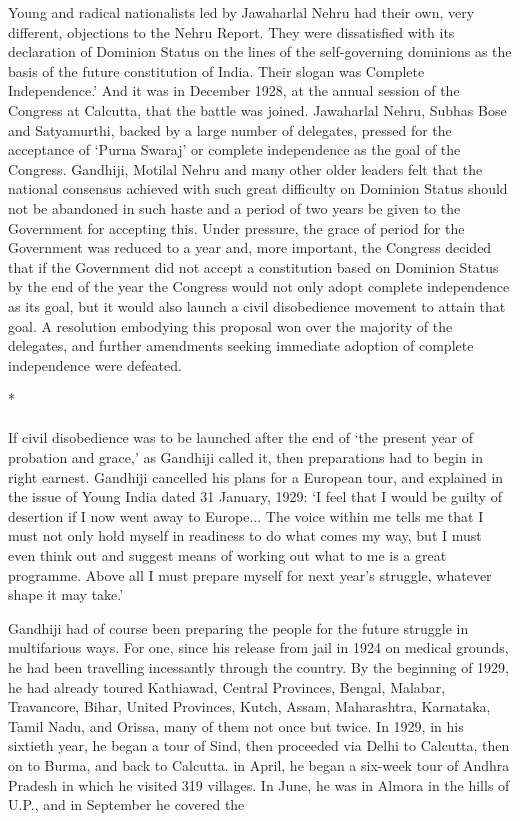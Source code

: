 Young and radical nationalists led by Jawaharlal Nehru had their own, very different, objections to the Nehru Report. They were dissatisfied with its declaration of Dominion Status on the lines of the self-governing dominions as the basis of the future constitution of India. Their slogan was Complete Independence.' And it was in December 1928, at the annual session of the Congress at Calcutta, that the battle was joined. Jawaharlal Nehru, Subhas Bose and Satyamurthi, backed by a large number of delegates, pressed for the acceptance of `Purna Swaraj' or complete independence as the goal of the Congress. Gandhiji, Motilal Nehru and many other older leaders felt that the national consensus achieved with such great difficulty on Dominion Status should not be abandoned in such haste and a period of two years be given to the Government for accepting this. Under pressure, the grace of period for the Government was reduced to a year and, more important, the Congress decided that if the Government did not accept a constitution based on Dominion Status by the end of the year the Congress would not only adopt complete independence as its goal, but it would also launch a civil disobedience movement to attain that goal. A resolution embodying this proposal won over the majority of the delegates, and further amendments seeking immediate adoption of complete independence were defeated.

\begin{center}*\end{center}

\paragraph*{}


If civil disobedience was to be launched after the end of `the present year of probation and grace,' as Gandhiji called it, then preparations had to begin in right earnest. Gandhiji cancelled his plans for a European tour, and explained in the issue of Young India dated 31 January, 1929: `I feel that I would be guilty of desertion if I now went away to Europe... The voice within me tells me that I must not only hold myself in readiness to do what comes my way, but I must even think out and suggest means of working out what to me is a great programme. Above all I must prepare myself for next year's struggle, whatever shape it may take.' 

Gandhiji had of course been preparing the people for the future struggle in multifarious ways. For one, since his release from jail in 1924 on medical grounds, he had been travelling incessantly through the country. By the beginning of 1929, he had already toured Kathiawad, Central Provinces, Bengal, Malabar, Travancore, Bihar, United Provinces, Kutch, Assam, Maharashtra, Karnataka, Tamil Nadu, and Orissa, many of them not once but twice. In 1929, in his sixtieth year, he began a tour of Sind, then proceeded via Delhi to Calcutta, then on to Burma, and back to Calcutta. in April, he began a six-week tour of Andhra Pradesh in which he visited 319 villages. In June, he was in Almora in the hills of U.P., and in September he covered the 

